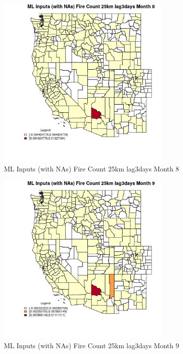 \begin{figure} 
\centering  
\includegraphics[width=0.77\textwidth]{Code_Outputs/Report_ML_input_PM25_Step4_part_e_de_duplicated_aves_compiled_2019-05-21wNAs_CountyFire_Count_25km_lag3daysmedianMonth8.jpg} 
\caption{\label{fig:Report_ML_input_PM25_Step4_part_e_de_duplicated_aves_compiled_2019-05-21wNAsCountyFire_Count_25km_lag3daysmedianMonth8}ML Inputs (with NAs) Fire Count 25km lag3days Month 8} 
\end{figure} 
 

\begin{figure} 
\centering  
\includegraphics[width=0.77\textwidth]{Code_Outputs/Report_ML_input_PM25_Step4_part_e_de_duplicated_aves_compiled_2019-05-21wNAs_CountyFire_Count_25km_lag3daysmedianMonth9.jpg} 
\caption{\label{fig:Report_ML_input_PM25_Step4_part_e_de_duplicated_aves_compiled_2019-05-21wNAsCountyFire_Count_25km_lag3daysmedianMonth9}ML Inputs (with NAs) Fire Count 25km lag3days Month 9} 
\end{figure} 
 

